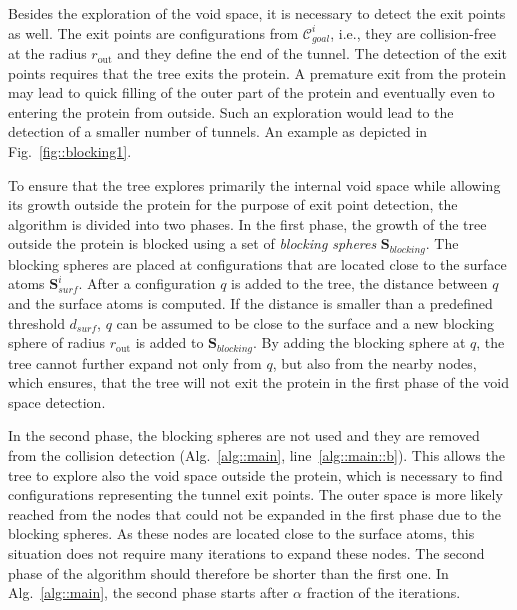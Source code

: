 \documentclass[usletter, 10pt, conference]{svjour3}      %
\def\CG{\mathcal{C}_{goal}}
\def\dts{d_{surf}}
\def\gprobe{r_{\mathrm{out}}}
\def\SB{\mathbf{S}_{blocking}}
\def\SSA{\mathbf{S}_{surf}}
\begin{document}
Besides the exploration of the void space, it is necessary to detect the exit points as well.
The exit points are configurations from $\CG^i$, i.e., they are collision-free at the radius $\gprobe$ and they define the end of the tunnel.
The detection of the exit points requires that the tree exits the protein.
A premature exit from the protein may lead to quick filling of the outer part of the protein and eventually even to entering the protein from outside. 
Such an exploration would lead to the detection of a smaller number of tunnels.
An example as depicted in Fig.~\ref{fig::blocking1}.

To ensure that the tree explores primarily the internal void space while allowing its growth outside the protein for the purpose of exit point detection, the algorithm is divided into two phases.
In the first phase, the growth of the tree outside the protein is blocked using a set of {\sl blocking spheres} $\SB$.
The blocking spheres are placed at configurations that are located close to the surface atoms $\SSA^i$.
After a configuration $q$ is added to the tree, the distance between $q$ and the surface atoms is computed.
If the distance is smaller than a predefined threshold $\dts$, $q$ can be assumed to be close to the surface and a new blocking sphere of radius $\gprobe$ is added to $\SB$.
By adding the blocking sphere at $q$, the tree cannot further expand not only from $q$, but also from the nearby nodes, which ensures,
   that the tree will not exit the protein in the first phase of the void space detection.

In the second phase, the blocking spheres are not used and they are removed from the collision detection (Alg.~\ref{alg::main}, line~\ref{alg::main::b}).
This allows the tree to explore also the void space outside the protein, which is necessary to find configurations representing the tunnel exit points.
The outer space is more likely reached from the nodes that could not be expanded in the first phase due to the blocking spheres.
As these nodes are located close to the surface atoms, this situation does not require many iterations to expand these nodes.
The second phase of the algorithm should therefore be shorter than the first one.
In Alg.~\ref{alg::main}, the second phase starts after $\alpha$ fraction of the iterations.
\end{document}

